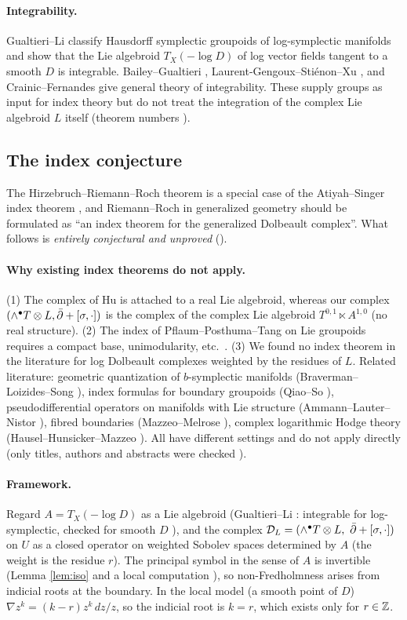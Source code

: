 \paragraph{Integrability.} \tC Gualtieri--Li \cite{GL} classify Hausdorff symplectic groupoids of log-symplectic manifolds and show that the Lie algebroid $T_X(-\log D)$ of log vector fields tangent to a smooth $D$ is integrable. Bailey--Gualtieri \cite{BG}, Laurent-Gengoux--Sti\'enon--Xu \cite{LGSX2}, and Crainic--Fernandes \cite{CF} give general theory of integrability. These supply groups as input for index theory but do not treat the integration of the complex Lie algebroid $L$ itself (theorem numbers \tQ).

\subsection{The index conjecture}
The Hirzebruch--Riemann--Roch theorem is a special case of the Atiyah--Singer index theorem \cite{AS}, and Riemann--Roch in generalized geometry should be formulated as ``an index theorem for the generalized Dolbeault complex''. What follows is \emph{entirely conjectural and unproved} (\tK).

\paragraph{Why existing index theorems do not apply.} (1) The complex of Hu \cite{Hu2} is attached to a real Lie algebroid, whereas our complex $(\wedge^\bullet T\otimes L,\bar\partial+[\sigma,\cdot])$ is the complex of the complex Lie algebroid $T^{0,1}\ltimes A^{1,0}$ (no real structure). (2) The index of Pflaum--Posthuma--Tang \cite{PPT} on Lie groupoids requires a compact base, unimodularity, etc.\ \tQ. (3) We found no index theorem in the literature for log Dolbeault complexes weighted by the residues of $L$. Related literature: geometric quantization of $b$-symplectic manifolds (Braverman--Loizides--Song \cite{BLS}), index formulas for boundary groupoids (Qiao--So \cite{QS}), pseudodifferential operators on manifolds with Lie structure (Ammann--Lauter--Nistor \cite{ALN}), fibred boundaries (Mazzeo--Melrose \cite{MM}), complex logarithmic Hodge theory (Hausel--Hunsicker--Mazzeo \cite{HHM}). All have different settings and do not apply directly (only titles, authors and abstracts were checked \tQ).

\paragraph{Framework.} Regard $A=T_X(-\log D)$ as a Lie algebroid (Gualtieri--Li \cite{GL}: integrable for log-symplectic, checked for smooth $D$ \tC \tQ), and the complex $\mathcal D_L=(\wedge^\bullet T\otimes L,\ \bar\partial+[\sigma,\cdot])$ on $U$ as a closed operator on weighted Sobolev spaces determined by $A$ (the weight is the residue $r$). The principal symbol in the sense of $A$ is invertible (Lemma \ref{lem:iso} and a local computation \tV), so non-Fredholmness arises from indicial roots at the boundary. In the local model (a smooth point of $D$) $\nabla z^k=(k-r)z^k\,dz/z$, so the indicial root is $k=r$, which exists only for $r\in\mathbb Z$.

